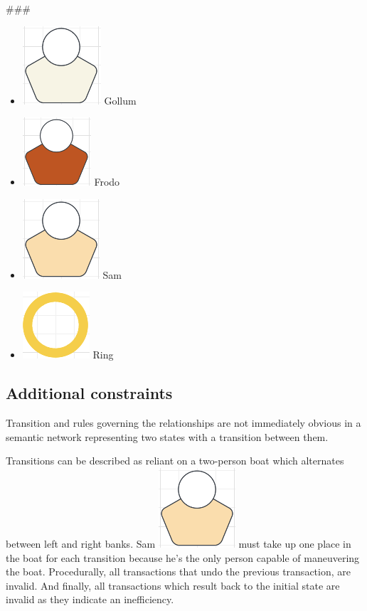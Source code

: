 \documentclass[
	letterpaper, %
]{jdf}
\begin{document}
\begin{Abstract}
###
\begin{itemize}
	\item \includegraphics[scale=0.7]{Figures/gollum.png} Gollum
	\item \includegraphics[scale=0.7]{Figures/frodo.png} Frodo
	\item \includegraphics[scale=0.7]{Figures/sam.png} Sam
	\item \includegraphics[scale=0.7]{Figures/ring.png} Ring
\end{itemize}

\subsection{Additional constraints}
Transition and rules governing the relationships are not immediately obvious in a semantic network representing two states with a transition between them.

Transitions can be described as reliant on a two-person boat which alternates between left and right banks. Sam \includegraphics[scale=0.7]{Figures/sam.png} must take up one place in the boat for each transition because he's the only person capable of maneuvering the boat. Procedurally, all transactions that undo the previous transaction, are invalid. And finally, all transactions which result back to the initial state are invalid as they indicate an inefficiency.


\end{Abstract}
\end{document}
